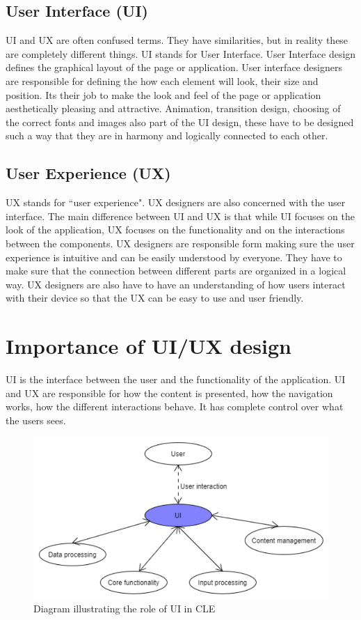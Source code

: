 \documentclass[10pt,english,a4paper]{article}
\begin{document}
\subsection{User Interface (UI)}
UI and UX are often confused terms\cite{theymakedesign_2019_what}. They have similarities, but in reality
these are completely different things.
UI stands for User Interface. User Interface design defines the graphical layout of the page or application.
User interface designers are responsible for defining the how each element will look, their size and position.
Its their job to make the look and feel of the page or application aesthetically pleasing and 
attractive. Animation, transition design, choosing of the correct fonts and images also part of the UI design, 
these have to be designed such a way that they are in harmony and logically connected to each other\cite{theymakedesign_2019_what}.


\subsection{User Experience (UX)}
UX stands for ``user experience". UX designers are also concerned with the user interface\cite{theymakedesign_2019_what}. 
The main difference between UI and UX is that while UI focuses on the look of the application,
UX focuses on the functionality and on the interactions between the components. UX designers are 
responsible form making sure the user experience is intuitive and can be easily understood by everyone.
They have to make sure that the connection between different parts are organized in a logical way.
UX designers are also have to have an understanding of how users interact with their
device so that the UX can be easy to use and user friendly\cite{theymakedesign_2019_what}. 

\section{Importance of UI/UX design}\label{importance}
UI is the interface between the user and the functionality of the application. UI and UX are responsible for
how the content is presented, how the navigation works, how the different interactions behave. It 
has complete control over what the users sees.
\begin{figure}[H]
    \centering
    \includegraphics[width=1\textwidth]{images/ui-diagram.pdf}
    \caption{Diagram illustrating the role of UI in CLE}
\end{figure}
\end{document}
